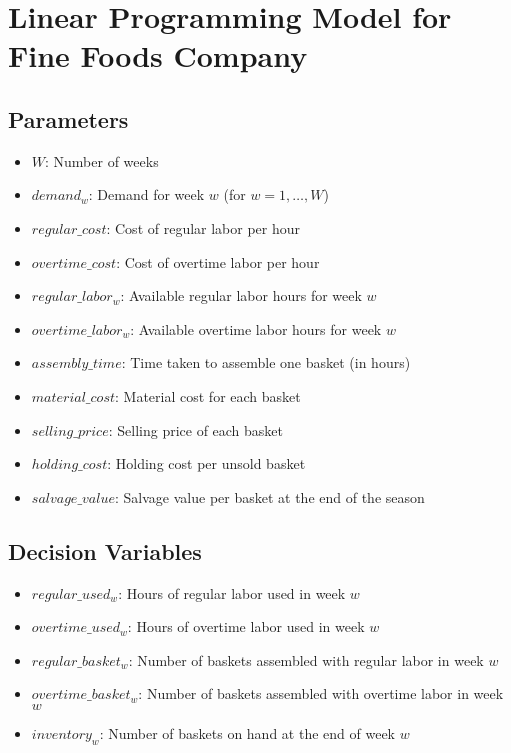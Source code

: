 \documentclass{article}
\begin{document}
\section*{Linear Programming Model for Fine Foods Company}

\subsection*{Parameters}
\begin{itemize}
    \item $W$: Number of weeks
    \item $demand_w$: Demand for week $w$ (for $w = 1, \ldots, W$)
    \item $regular\_cost$: Cost of regular labor per hour
    \item $overtime\_cost$: Cost of overtime labor per hour
    \item $regular\_labor_w$: Available regular labor hours for week $w$
    \item $overtime\_labor_w$: Available overtime labor hours for week $w$
    \item $assembly\_time$: Time taken to assemble one basket (in hours)
    \item $material\_cost$: Material cost for each basket
    \item $selling\_price$: Selling price of each basket
    \item $holding\_cost$: Holding cost per unsold basket
    \item $salvage\_value$: Salvage value per basket at the end of the season
\end{itemize}

\subsection*{Decision Variables}
\begin{itemize}
    \item $regular\_used_w$: Hours of regular labor used in week $w$
    \item $overtime\_used_w$: Hours of overtime labor used in week $w$
    \item $regular\_basket_w$: Number of baskets assembled with regular labor in week $w$
    \item $overtime\_basket_w$: Number of baskets assembled with overtime labor in week $w$
    \item $inventory_w$: Number of baskets on hand at the end of week $w$
\end{itemize}
\end{document}
